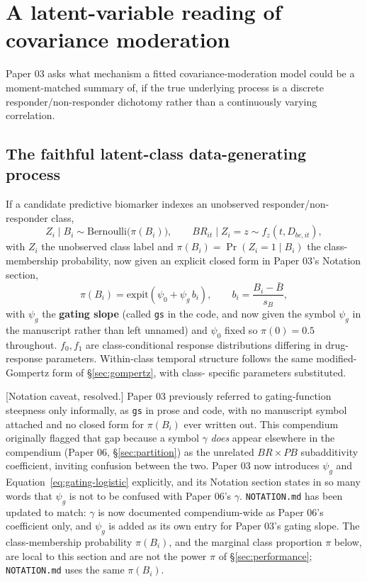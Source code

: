 \documentclass[11pt]{article}
\newcommand{\note}[1]{\textcolor{blue!60!black}{\small [#1]}}
\newcommand{\code}[1]{\texttt{#1}}
\begin{document}
\section{A latent-variable reading of covariance moderation}
\label{sec:latent}

Paper 03 asks what mechanism a fitted covariance-moderation model
could be a moment-matched summary of, if the true underlying
process is a discrete responder/non-responder dichotomy rather than a
continuously varying correlation.

\subsection{The faithful latent-class data-generating process}

If a candidate predictive biomarker indexes an unobserved
responder/non-responder class,
\begin{equation}
Z_i \mid B_i \sim \mathrm{Bernoulli}\big(\pi(B_i)\big), \qquad
  BR_{it} \mid Z_i = z \sim f_z(t, D_{bc,it}),
\label{eq:latent-class}
\end{equation}
with $Z_i$ the unobserved class label and $\pi(B_i) = \Pr(Z_i=1\mid
B_i)$ the class-membership probability, now given an explicit closed
form in Paper 03's Notation section,
\begin{equation}
\pi(B_i) = \mathrm{expit}(\psi_0 + \psi_g\, b_i), \qquad b_i =
  \frac{B_i - \bar B}{s_B},
\label{eq:gating-logistic}
\end{equation}
with $\psi_g$ the \textbf{gating slope} (called \code{gs} in the
code, and now given the symbol $\psi_g$ in the manuscript rather than
left unnamed) and $\psi_0$ fixed so $\pi(0)=0.5$ throughout. $f_0,
f_1$ are class-conditional response distributions differing in
drug-response parameters. Within-class temporal structure follows the
same modified-Gompertz form of \S\ref{sec:gompertz}, with class-
specific parameters substituted.

\note{Notation caveat, resolved.} Paper 03 previously referred to
gating-function steepness only informally, as \code{gs} in prose and
code, with no manuscript symbol attached and no closed form for
$\pi(B_i)$ ever written out. This compendium originally flagged that
gap because a symbol $\gamma$ \emph{does} appear elsewhere in the
compendium (Paper 06, \S\ref{sec:partition}) as the unrelated $BR
\times PB$ subadditivity coefficient, inviting confusion between the
two. Paper 03 now introduces $\psi_g$ and
Equation~\eqref{eq:gating-logistic} explicitly, and its Notation
section states in so many words that $\psi_g$ is not to be confused
with Paper 06's $\gamma$. \code{NOTATION.md} has been updated to match:
$\gamma$ is now documented compendium-wide as Paper 06's coefficient
only, and $\psi_g$ is added as its own entry for Paper 03's gating
slope. The class-membership probability $\pi(B_i)$, and the marginal
class proportion $\pi$ below, are local to this section and are not the
power $\pi$ of \S\ref{sec:performance}; \code{NOTATION.md} uses the
same $\pi(B_i)$.
\end{document}
